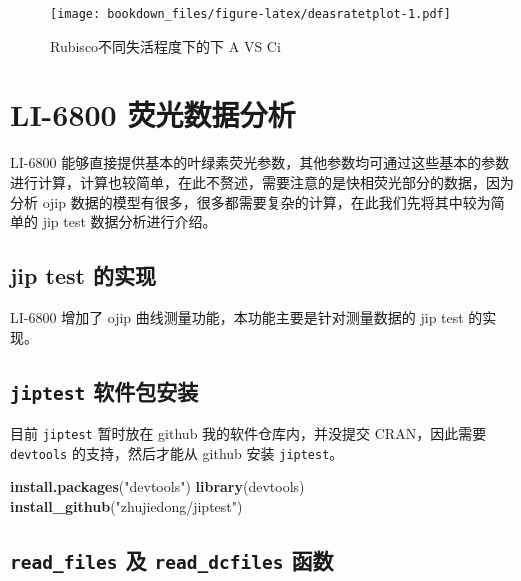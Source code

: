 \documentclass[
]{krantz}
\makeatletter
\newenvironment{Shaded}{\begin{snugshade}}{\end{snugshade}}
\newcommand{\KeywordTok}[1]{\textcolor[rgb]{0.13,0.29,0.53}{\textbf{#1}}}
\newcommand{\NormalTok}[1]{#1}
\newcommand{\StringTok}[1]{\textcolor[rgb]{0.31,0.60,0.02}{#1}}
\newenvironment{kframe}{%
\medskip{}
\setlength{\fboxsep}{.8em}
 \def\at@end@of@kframe{}%
 \ifinner\ifhmode%
  \def\at@end@of@kframe{\end{minipage}}%
  \begin{minipage}{\columnwidth}%
 \fi\fi%
 \def\FrameCommand##1{\hskip\@totalleftmargin \hskip-\fboxsep
 \colorbox{shadecolor}{##1}\hskip-\fboxsep
     \hskip-\linewidth \hskip-\@totalleftmargin \hskip\columnwidth}%
 \MakeFramed {\advance\hsize-\width
   \@totalleftmargin\z@ \linewidth\hsize
   \@setminipage}}%
 {\par\unskip\endMakeFramed%
 \at@end@of@kframe}
\renewenvironment{Shaded}{\begin{kframe}}{\end{kframe}}
\makeatother
\begin{document}
\begin{figure}
\centering
\texttt{[image: bookdown\_files/figure-latex/deasratetplot-1.pdf]}
\caption{\label{fig:deasratetplot}Rubisco不同失活程度下的下 A VS Ci}
\end{figure}

\cleardoublepage

\hypertarget{fluro68}{%
\section{LI-6800 荧光数据分析}\label{fluro68}}

LI-6800 能够直接提供基本的叶绿素荧光参数，其他参数均可通过这些基本的参数进行计算，计算也较简单，在此不赘述，需要注意的是快相荧光部分的数据，因为分析 ojip 数据的模型有很多，很多都需要复杂的计算，在此我们先将其中较为简单的 jip test 数据分析进行介绍。

\hypertarget{jiptest}{%
\subsection{jip test 的实现}\label{jiptest}}

LI-6800 增加了 ojip 曲线测量功能，本功能主要是针对测量数据的 jip test 的实现。

\hypertarget{jiptest_pack}{%
\subsection{\texorpdfstring{\texttt{jiptest} 软件包安装}{jiptest 软件包安装}}\label{jiptest_pack}}

目前 \texttt{jiptest} 暂时放在 github 我的软件仓库内，并没提交 CRAN，因此需要 \texttt{devtools} 的支持，然后才能从 github 安装 \texttt{jiptest}。

\begin{Shaded}
\begin{Highlighting}[]
\KeywordTok{install.packages}\NormalTok{(}\StringTok{"devtools"}\NormalTok{)}
\KeywordTok{library}\NormalTok{(devtools)}
\KeywordTok{install\_github}\NormalTok{(}\StringTok{"zhujiedong/jiptest"}\NormalTok{)}
\end{Highlighting}
\end{Shaded}

\hypertarget{readfluor}{%
\subsection{\texorpdfstring{\texttt{read\_files} 及 \texttt{read\_dcfiles} 函数}{read\_files 及 read\_dcfiles 函数}}\label{readfluor}}
\end{document}

